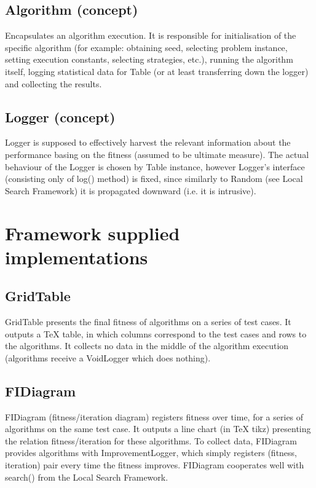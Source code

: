 \subsection{Algorithm (concept)}

Encapsulates an algorithm execution. It is responsible for
initialisation of the specific algorithm (for example: obtaining seed, 
selecting problem instance, setting execution constants, selecting strategies,
etc.), running the algorithm itself, logging statistical data for Table
(or at least transferring down the logger) and collecting the results.

\subsection{Logger (concept)}

Logger is supposed to effectively harvest the relevant information
about the performance basing on the fitness (assumed to be ultimate measure).
The actual behaviour of the Logger is chosen by Table instance, however
Logger's interface (consisting only of log() method) is fixed,
since similarly to Random (see Local Search Framework) it is propagated downward
(i.e. it is intrusive).

\section{Framework supplied implementations}

\subsection{GridTable}

GridTable presents the final fitness of algorithms on a series of test cases.
It outputs a TeX table, in which columns correspond to the test cases and
rows to the algorithms. It collects no data in the middle of the algorithm
execution (algorithms receive a VoidLogger which does nothing).

\subsection{FIDiagram}

FIDiagram (fitness/iteration diagram) registers fitness over time,
for a series of algorithms on the same test case.
It outputs a line chart (in TeX tikz) presenting the relation fitness/iteration
for these algorithms. To collect data, FIDiagram provides algorithms with
ImprovementLogger, which simply registers (fitness, iteration) pair every time the fitness
improves. FIDiagram cooperates well with search() from the Local Search Framework.

